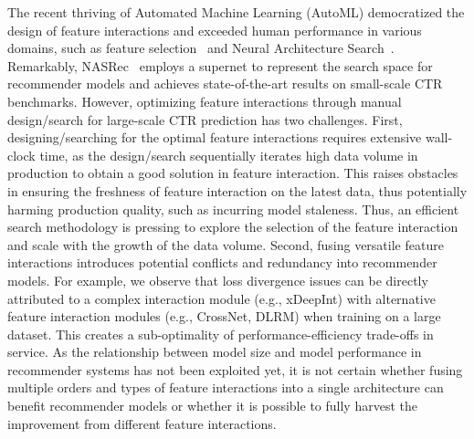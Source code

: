 The recent thriving of Automated Machine Learning (AutoML) democratized the design of feature interactions and exceeded human performance in various domains, such as feature selection~\cite{liu2020autofis} and Neural Architecture Search~\cite{song2020towards,zhang2022nasrec,krishna2021differentiable}.
Remarkably, NASRec~\cite{zhang2022nasrec} employs a supernet to represent the search space for recommender models and achieves state-of-the-art results on small-scale CTR benchmarks.
However, optimizing feature interactions through manual design/search for large-scale CTR prediction has two challenges.
First, designing/searching for the optimal feature interactions requires
extensive wall-clock time, as the design/search sequentially iterates high data volume in production to obtain a good solution in feature interaction.
This raises obstacles in ensuring the freshness of feature interaction on the latest data, thus potentially harming production quality, such as incurring model staleness.
Thus, an efficient search methodology is pressing to explore the selection of the feature interaction and scale with the growth of the data volume.
Second, fusing versatile feature interactions introduces potential conflicts and redundancy into recommender models.
For example, we observe that loss divergence issues can be directly attributed to a complex interaction module (e.g., xDeepInt) with alternative feature interaction modules (e.g., CrossNet, DLRM) when training on a large dataset.
This creates a sub-optimality of performance-efficiency trade-offs in service. 
As the relationship between model size and model performance in recommender systems has not been exploited yet, it is not certain whether fusing multiple orders and types of feature interactions into a single architecture can benefit recommender models or whether it is possible to fully harvest the improvement from different feature interactions. 

